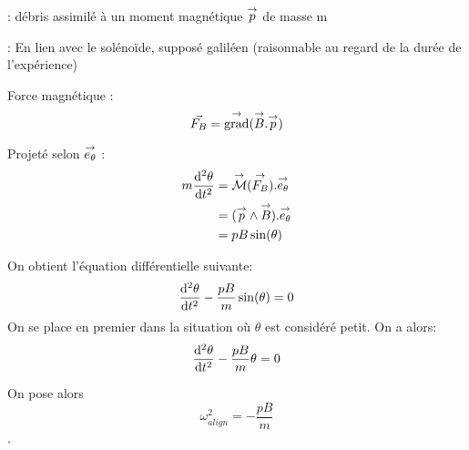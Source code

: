 \documentclass{report}
\begin{document}
: {débris assimilé à un moment magnétique $\overset{\to}{p}$ de masse m}

: En lien avec le solénoïde, supposé galiléen (raisonnable au regard de la durée de l'expérience)


Force magnétique :
$$\vec{F_B} = \overset{\to}{\text{grad}}(\overset{\to}{B}.\overset{\to}{p})$$


Projeté selon $\overset{\to}{e_\theta}$ :
\begin{align*}
m \frac{\mathrm{d^2}\theta}{\mathrm{d}t^2} &= \overset{\to}{\mathcal{M}}(\overset{\to}{F_B}) . \overset{\to}{e_\theta} \\
&= (\overset{\to}{p} \wedge \overset{\to}{B}).\overset{\to}{e_\theta}\\
&= pB\sin(\theta)
\end{align*}

On obtient l'équation différentielle suivante:
$$\frac{\mathrm{d^2}\theta}{\mathrm{d}t^2} - \frac{pB}{m} \sin(\theta) = 0$$
On se place en premier dans la situation où $\theta$ est considéré petit. On a alors:
$$\frac{\mathrm{d^2}\theta}{\mathrm{d}t^2} - \frac{pB}{m} \theta = 0$$

On pose alors $$\omega_{align}^2 = - \frac{pB}{m}$$.
\end{document}
